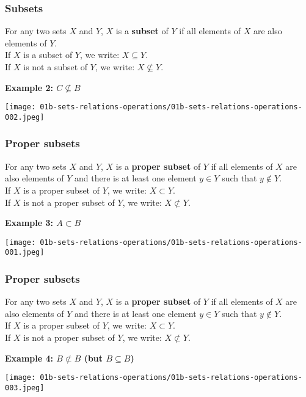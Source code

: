 \documentclass[fleqn,10pt,serif,xcolor=svgnames,xcolor=table,aspectratio=169,handout]{beamer}
\begin{document}
\begin{frame}
  \frametitle{Subsets}

  For any two sets $X$ and $Y$, $X$ is a \textbf{subset} of $Y$ if all elements of $X$ are also elements of $Y$. \\
  If $X$ is a subset of $Y$, we write: $X \subseteq Y$.\\
  If $X$ is not a subset of $Y$, we write: $X \not \subseteq Y$.

  \bigskip

  \hfill \textbf{Example 2: $C \not \subseteq B$}

  \hfill \texttt{[image: 01b-sets-relations-operations/01b-sets-relations-operations-002.jpeg]}

\end{frame}

\begin{frame}
  \frametitle{Proper subsets}

  For any two sets $X$ and $Y$, $X$ is a \textbf{proper subset} of $Y$ if all elements of $X$ are also elements of $Y$ and there is at least one element $y \in Y$ such that $y \not \in Y$.\\
  If $X$ is a proper subset of $Y$, we write: $X \subset Y$.\\
  If $X$ is not a proper subset of $Y$, we write: $X \not \subset Y$.

\pause

  \bigskip

  \hfill \textbf{Example 3: $A \subset B$}

  \hfill \texttt{[image: 01b-sets-relations-operations/01b-sets-relations-operations-001.jpeg]}

\end{frame}

\begin{frame}
  \frametitle{Proper subsets}

  For any two sets $X$ and $Y$, $X$ is a \textbf{proper subset} of $Y$ if all elements of $X$ are also elements of $Y$ and there is at least one element $y \in Y$ such that $y \not \in Y$.\\
  If $X$ is a proper subset of $Y$, we write: $X \subset Y$.\\
  If $X$ is not a proper subset of $Y$, we write: $X \not \subset Y$.



  \hfill \textbf{Example 4: $B \not \subset B$ (but $B \subseteq B$)}

  \hfill \texttt{[image: 01b-sets-relations-operations/01b-sets-relations-operations-003.jpeg]}

\end{frame}
\end{document}
